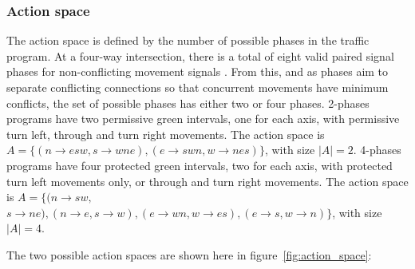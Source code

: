 \documentclass[journal]{IEEEtran}
\begin{document}
\subsubsection{Action space}
The action space is defined by the number of possible phases in the traffic program. At a four-way intersection, there is a total of eight valid paired signal phases for non-conflicting movement signals \cite{wei2020survey}. From this, and as phases aim to separate conflicting connections so that concurrent movements have minimum conflicts, the set of possible phases has either two or four phases. 2-phases programs have two permissive green intervals, one for each axis, with permissive turn left, through and turn right movements. The action space is $A=\{(n\rightarrow esw,s\rightarrow wne),(e\rightarrow swn,w\rightarrow nes)\}$, with size $|A|=2$. 4-phases programs have four protected green intervals, two for each axis, with protected turn left movements only, or through and turn right movements. The action space is $A=\{(n\rightarrow sw,$ $s\rightarrow ne),(n\rightarrow e,s\rightarrow w),(e\rightarrow wn,w\rightarrow es),(e\rightarrow s,w\rightarrow n)\}$, with size $|A|=4$.

The two possible action spaces are shown here in figure~\ref{fig:action_space}:
\end{document}
